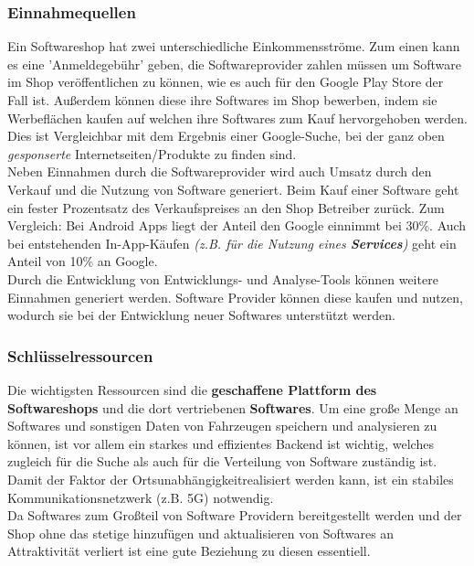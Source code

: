 \subsubsection{Einnahmequellen}
Ein Softwareshop hat zwei unterschiedliche Einkommensströme. Zum einen kann es eine 'Anmeldegebühr' geben, die Softwareprovider zahlen müssen um Software im Shop veröffentlichen zu können, wie es auch für den Google Play Store der Fall ist. Außerdem können diese ihre Softwares im Shop bewerben, indem sie Werbeflächen kaufen auf welchen ihre Softwares zum Kauf hervorgehoben werden. Dies ist Vergleichbar mit dem Ergebnis einer Google-Suche, bei der ganz oben \textit{gesponserte} Internetseiten/Produkte zu finden sind.\\
Neben Einnahmen durch die Softwareprovider wird auch Umsatz durch den Verkauf und die Nutzung von Software generiert. Beim Kauf einer Software geht ein fester Prozentsatz des Verkaufspreises an den Shop Betreiber zurück. Zum Vergleich: Bei Android Apps liegt der Anteil den Google einnimmt bei 30\%. Auch bei entstehenden In-App-Käufen \textit{(z.B. für die Nutzung eines \textbf{Services})} geht ein Anteil von 10\% an Google.\\
Durch die Entwicklung von Entwicklungs- und Analyse-Tools können weitere Einnahmen generiert werden. Software Provider können diese kaufen und nutzen, wodurch sie bei der Entwicklung neuer Softwares unterstützt werden.

\subsubsection{Schlüsselressourcen}
Die wichtigsten Ressourcen sind die \textbf{geschaffene Plattform des Softwareshops} und die dort vertriebenen \textbf{Softwares}. Um eine große Menge an Softwares und sonstigen Daten von Fahrzeugen speichern und analysieren zu können, ist vor allem ein starkes und effizientes Backend ist wichtig, welches zugleich für die Suche als auch für die Verteilung von Software zuständig ist. Damit der Faktor der Ortsunabhängigkeitrealisiert werden kann, ist ein stabiles Kommunikationsnetzwerk (z.B. 5G\cite[S. 10]{vda}) notwendig. \\
Da Softwares zum Großteil von Software Providern bereitgestellt werden und der Shop ohne das stetige hinzufügen und aktualisieren von Softwares an Attraktivität verliert ist eine gute Beziehung zu diesen essentiell.\\

